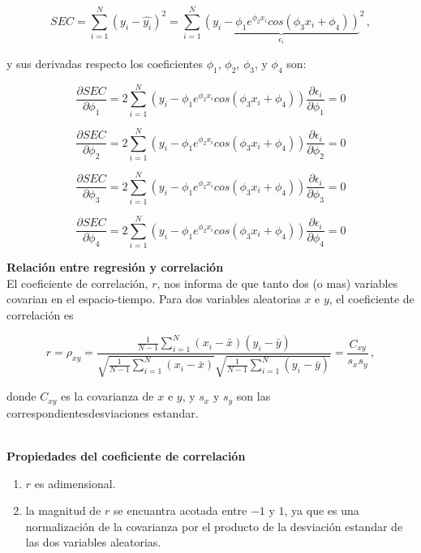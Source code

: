 \documentclass[
]{agujournal2019}
\providecommand{\tightlist}{%
  \setlength{\itemsep}{0pt}\setlength{\parskip}{0pt}}\usepackage{longtable,booktabs,array}
\begin{document}
\[SEC=\sum\limits^N_{i=1}(y_i-\hat{y_i})^2=\sum\limits^N_{i=1}
              {\underbrace{\left(y_i - \phi_1 e^{\phi_2 x_i} cos(\phi_3 x_i + \phi_4)\right)}_{\epsilon_i}}^2\,,\]

y sus derivadas respecto los coeficientes \(\phi_1\), \(\phi_2\),
\(\phi_3\), y \(\phi_4\) son:

\[\frac{\partial{SEC}}{\partial{\phi_1}}=
     2\sum\limits^N_{i=1}\left(y_i - \phi_1 e^{\phi_2 x_i} cos(\phi_3 x_i + \phi_4)\right)
     \frac{\partial{\epsilon_i}}{\partial{\phi_1}}=0\]

\[\frac{\partial{SEC}}{\partial{\phi_2}}=2\sum\limits^N_{i=1}\left(y_i - \phi_1 e^{\phi_2 x_i} cos(\phi_3 x_i + \phi_4)\right)
\frac{\partial{\epsilon_i}}{\partial{\phi_2}}=0\]

\[\frac{\partial{SEC}}{\partial{\phi_3}}=
    2\sum\limits^N_{i=1}\left(y_i - \phi_1 e^{\phi_2 x_i} cos(\phi_3 x_i + \phi_4)\right)
    \frac{\partial{\epsilon_i}}{\partial{\phi_3}}=0\]

\[\frac{\partial{SEC}}{\partial{\phi_4}}=
    2\sum\limits^N_{i=1}\left(y_i - \phi_1 e^{\phi_2 x_i} cos(\phi_3 x_i + \phi_4)\right)
    \frac{\partial{\epsilon_i}}{\partial{\phi_4}}=0\]

\vspace{0.5cm}

\textbf{Relación entre regresión y correlación}\\

El coeficiente de correlación, \(r\), nos informa de que tanto dos (o
mas) variables covarian en el espacio-tiempo. Para dos variables
aleatorias \(x\) e \(y\), el coeficiente de correlación es

\[r=\rho_{xy}=\frac{\frac{1}{N-1}\sum\limits^N_{i=1}(x_i-\bar{x})(y_i-\bar{y})}
     {\sqrt{\frac{1}{N-1}\sum\limits^N_{i=1}(x_i-\bar{x})}
     \sqrt{\frac{1}{N-1}\sum\limits^N_{i=1}(y_i-\bar{y})}}=\frac{C_{xy}}{s_x s_y}\,,\]

donde \(C_{xy}\) es la covarianza de \(x\) e \(y\), y \(s_x\) y \(s_y\)
son las correspondientesdesviaciones estandar.\\
\strut \\
\textbf{Propiedades del coeficiente de correlación}\\

\begin{enumerate}
\def\labelenumi{(\arabic{enumi})}
\tightlist
\item
  \(r\) es adimensional.\\
\item
  la magnitud de \(r\) se encuantra acotada entre \(-1\) y \(1\), ya que
  es una normalización de la covarianza por el producto de la desviación
  estandar de las dos variables aleatorias.\\
\end{enumerate}
\end{document}
